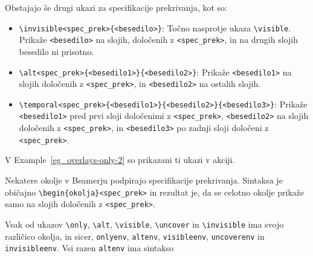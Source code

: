 \begin{example}\label{eg_overlays-only-1}\end{example}Obstajajo še drugi ukazi za specifikacije prekrivanja, kot so:

\begin{itemize}
\item \texttt{{\textbackslash}invisible\textless spec\_prek\textgreater \{\textless besedilo\textgreater \}}: Točno nasprotje ukaza \texttt{{\textbackslash}visible}. Prikaže \texttt{\textless besedilo\textgreater } na slojih, določenih z \texttt{\textless spec\_prek\textgreater }, in na drugih slojih besedilo ni prisotno.
\item \texttt{{\textbackslash}alt\textless spec\_prek\textgreater \{\textless besedilo1\textgreater \}\{\textless besedilo2\textgreater \}}: Prikaže \texttt{\textless besedilo1\textgreater } na slojih določenih z \texttt{\textless spec\_prek\textgreater }, in \texttt{\textless besedilo2\textgreater } na ostalih slojih.
\item \texttt{{\textbackslash}temporal\textless spec\_prek\textgreater \{\textless besedilo1\textgreater \}\{\textless besedilo2\textgreater \}\{\textless besedilo3\textgreater \}}: Prikaže \texttt{\textless besedilo1\textgreater } pred prvi sloji določenimi z \texttt{\textless spec\_prek\textgreater }, \texttt{\textless besedilo2\textgreater } na slojih določenih z \texttt{\textless spec\_prek\textgreater }, in \texttt{\textless besedilo3\textgreater } po zadnji sloji določeni z \texttt{\textless spec\_prek\textgreater }.
\end{itemize}

V Example~\ref{eg_overlays-only-2} so prikazani ti ukazi v akciji.

\begin{example}\label{eg_overlays-only-2}\end{example}Nekatere okolje v Beamerju podpirajo specifikacije prekrivanja.
Sintaksa je običajno \texttt{{\textbackslash}begin\{okolja\}\textless spec\_prek\textgreater } in rezultat je, da se celotno okolje prikaže samo na slojih določenih z \texttt{\textless spec\_prek\textgreater }.

Vsak od ukazov \texttt{{\textbackslash}only}, \texttt{{\textbackslash}alt}, \texttt{{\textbackslash}visible}, \texttt{{\textbackslash}uncover} in \texttt{{\textbackslash}invisible} ima svojo različico okolja, in sicer, \texttt{onlyenv}, \texttt{altenv}, \texttt{visibleenv}, \texttt{uncoverenv} in \texttt{invisibleenv}.
Vsi razen \texttt{altenv} ima sintakso

